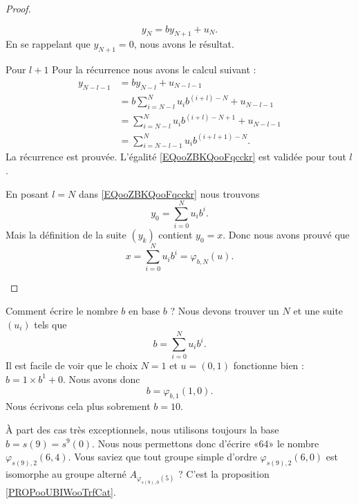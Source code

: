 \begin{proof}
\begin{subproof}
\begin{subproof}
			\begin{equation}
				y_N=by_{N+1}+u_N.
			\end{equation}
			En se rappelant que \( y_{N+1}=0\), nous avons le résultat.
			\item[Pour \( l+1\)]
			Pour la récurrence nous avons le calcul suivant :
			\begin{subequations}
				\begin{align}
					y_{N-l-1} & =by_{N-l}+u_{N-l-1}                       \\
					          & =b\sum_{i=N-l}^Nu_ib^{(i+l)-N}+u_{N-l-1}  \\
					          & =\sum_{i=N-l}^Nu_ib^{(i+l)-N+1}+u_{N-l-1} \\
					          & =\sum_{i=N-l-1}^Nu_ib^{(i+l+1)-N}.
				\end{align}
			\end{subequations}
			La récurrence est prouvée. L'égalité \eqref{EQooZBKQooFqcckr} est validée pour tout \( l\).
		\end{subproof}
		En posant \( l=N\) dans \eqref{EQooZBKQooFqcckr} nous trouvons
		\begin{equation}
			y_0=\sum_{i=0}^Nu_ib^i.
		\end{equation}
		Mais la définition de la suite \( (y_k)\) contient \( y_0=x\). Donc nous avons prouvé que
		\begin{equation}
			x=\sum_{i=0}^Nu_ib^i=\varphi_{b,N}(u).
		\end{equation}
	\end{subproof}
\end{proof}

\begin{example}
	Comment écrire le nombre \( b\) en base \( b\) ? Nous devons trouver un \( N\) et une suite \( (u_i)\) tels que
	\begin{equation}
		b=\sum_{i=0}^Nu_ib^i.
	\end{equation}
	Il est facile de voir que le choix \( N=1\) et \( u=(0,1)\) fonctionne bien : \( b=1\times b^1+0\). Nous avons donc
	\begin{equation}
		b=\varphi_{b,1}(1,0).
	\end{equation}
	Nous écrivons cela plus sobrement \( b=10\).
\end{example}

\begin{normaltext}
	À part des cas très exceptionnels, nous utilisons toujours la base \( b=s(9)=s^9(0)\). Nous nous permettons donc d'écrire «64» le nombre \( \varphi_{s(9), 2}(6,4)\). Vous saviez que tout groupe simple d'ordre \( \varphi_{s(9), 2}(6,0)\) est isomorphe au groupe alterné \( A_{\varphi_{s(9),0}(5)}\) ? C'est la proposition \ref{PROPooUBIWooTrfCat}.
\end{normaltext}

